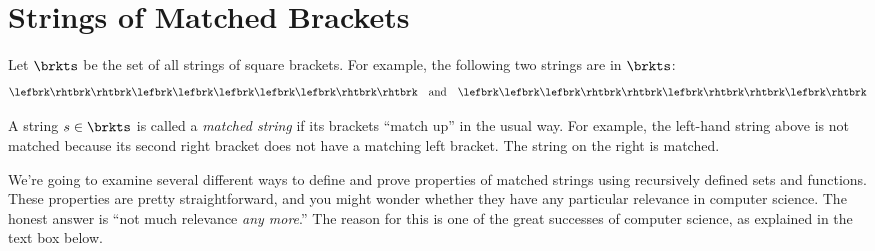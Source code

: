 \begin{problems}
\practiceproblems
{}

\classproblems
{}

\homeworkproblems

\examproblems
{}

\end{problems}

\section{Strings of Matched Brackets}

Let $\brkts$ be the set of all strings of square brackets.  For example,
the following two strings are in $\brkts$:
\begin{equation}\label{2strings}
\lefbrk\rhtbrk\rhtbrk\lefbrk\lefbrk\lefbrk\lefbrk\lefbrk\rhtbrk\rhtbrk\quad \text{and}\quad \lefbrk\lefbrk\lefbrk\rhtbrk\rhtbrk\lefbrk\rhtbrk\rhtbrk\lefbrk\rhtbrk
\end{equation}

A string $s \in \brkts$ is called a \emph{matched string} if its
brackets ``match up'' in the usual way.  For example, the left-hand
string above is not matched because its second right bracket does not
have a matching left bracket.  The string on the right is matched.

We're going to examine several different ways to define and prove
properties of matched strings using recursively defined sets and
functions.  These properties are pretty straightforward, and you might
wonder whether they have any particular relevance in computer science.
The honest answer is ``not much relevance \emph{any more}.''  The reason
for this is one of the great successes of computer science, as explained in
the text box below.

